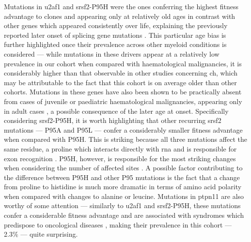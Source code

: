 Mutations in \ac{u2af1} and \ac{srsf2}-P95H were the ones conferring the highest fitness advantage to clones and appearing only at relatively old ages in contrast with other genes which appeared consistently over life, explaining the previously reported later onset of splicing gene mutations \cite{McKerrell2015-rl}. This particular age bias is further highlighted once their prevalence across other myeloid conditions is considered \cite{fig:prevalence-srsf2-p95h-u2af1} --- while mutations in these drivers appear at a relatively low prevalence in our cohort when compared with haematological malignancies, it is considerably higher than that observable in other studies concerning \ac{ch}, which may be attributable to the fact that this cohort is on average older than other cohorts. Mutations in these genes have also been shown to be practically absent from cases of juvenile or paediatric haematological malignancies, appearing only in adult cases \cite{Kar2013-nw,Takita2012-yo}, a possible consequence of the later age at onset. Specifically considering \ac{srsf2}-P95H, it is worth highlighting that other recurring \ac{srsf2} mutations --- P95A and P95L --- confer a considerably smaller fitness advantage when compared with P95H. This is striking because all three mutations affect the same residue, a proline which interacts directly with \ac{rna} and is responsible for exon recognition \cite{Daubner2012-zp,Kim2015-qz}. P95H, however, is responsible for the most striking changes when considering the number of affected sites \cite{Rahman2020-bh,Zhang2015-xu}. A possible factor contributing to the difference between P95H and other P95 mutations is the fact that a change from proline to histidine is much more dramatic in terms of amino acid polarity when compared with changes to alanine or leucine. Mutations in \ac{ptpn11} are also worthy of some attention --- similarly to \ac{u2af1} and \ac{srsf2}-P95H, these mutations confer a considerable fitness advantage and are associated with syndromes which predispose to oncological diseases \cite{Digilio2002-nq,Tartaglia2001-ru,Kratz2005-qh}, making their prevalence in this cohort --- 2.3\% --- quite surprising.

\begin{figure}[!ht]
	\label{fig:prevalence-srsf2-p95h-u2af1}
\end{figure}

